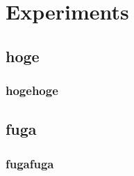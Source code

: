 \section{Experiments}
\subsection{hoge}
\subsubsection{hogehoge}
\subsection{fuga}
\subsubsection{fugafuga}